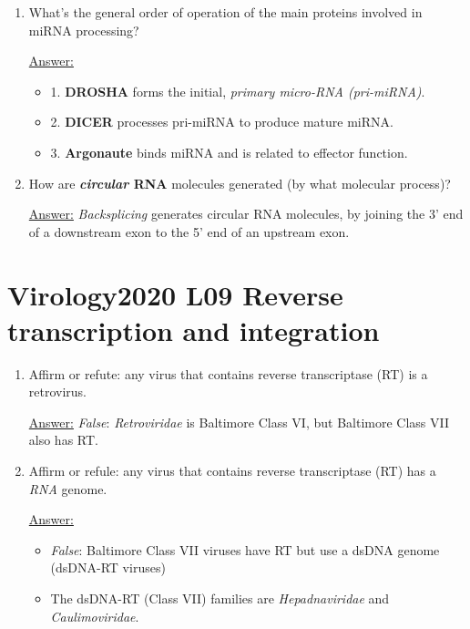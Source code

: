 \documentclass{article}
\newenvironment{QandA}{\begin{enumerate}[label=\bfseries Q\arabic*.]}
                       {\end{enumerate}}
\newenvironment{answered}{\par\normalfont\underline{Answer:}}{}
\begin{document}
\begin{QandA}
    \begin{answered}
    As with host cells, \textit{splicing generates \textbf{transcriptome diversity}}. The \textbf{genome economy} this facilitates, allowing the virus a compact but information-rich genome, is valuable.
    \end{answered}
  \item{What's the general order of operation of the main proteins involved in miRNA processing?}
    \begin{answered}
    \begin{itemize}
      \item{1. \textbf{DROSHA} forms the initial, \textit{primary micro-RNA (pri-miRNA)}.}
      \item{2. \textbf{DICER} processes pri-miRNA to produce mature miRNA.}
      \item{3. \textbf{Argonaute} binds miRNA and is related to effector function.}
    \end{itemize}
    \end{answered}
  \item{How are \textbf{\textit{circular} RNA} molecules generated (by what molecular process)?}
    \begin{answered}
    \textit{Backsplicing} generates circular RNA molecules, by joining the 3' end of a downstream exon to the 5' end of an upstream exon.
    \end{answered}
\end{QandA}
\section{Virology2020 L09 Reverse transcription and integration}
\begin{QandA}
  \item{Affirm or refute: any virus that contains reverse transcriptase (RT) is a retrovirus.}
    \begin{answered}
    \textit{False}: \textit{Retroviridae} is Baltimore Class VI, but Baltimore Class VII also has RT.
    \end{answered}
  \item{Affirm or refule: any virus that contains reverse transcriptase (RT) has a \textit{RNA} genome.}
    \begin{answered}
    \begin{itemize}
      \item{\textit{False}: Baltimore Class VII viruses have RT but use a dsDNA genome (dsDNA-RT viruses)}
      \item{The dsDNA-RT (Class VII) families are \textit{Hepadnaviridae} and \textit{Caulimoviridae}.}
    \end{itemize}
    \end{answered}
\end{QandA}
\end{document}
